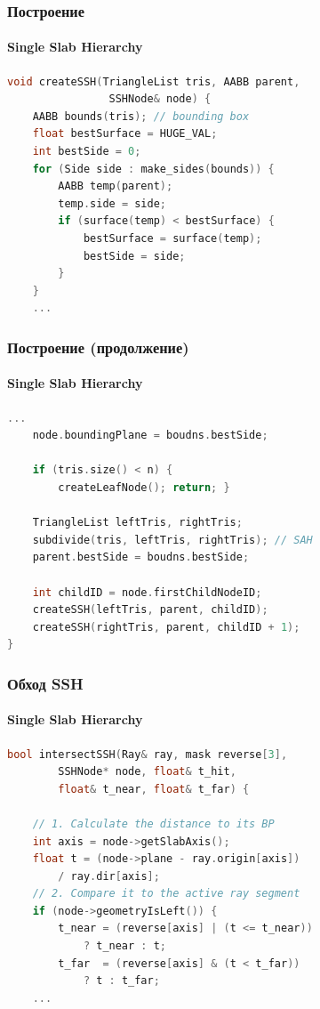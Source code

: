 \documentclass{beamer}
\begin{document}
\begin{frame}[fragile]
    \frametitle{Построение}
    \framesubtitle{Single Slab Hierarchy}

    \begin{lstlisting}[language=C++,basicstyle=\ttfamily,keywordstyle=\color{blue}]
void createSSH(TriangleList tris, AABB parent,
                SSHNode& node) {
    AABB bounds(tris); // bounding box
    float bestSurface = HUGE_VAL;
    int bestSide = 0;
    for (Side side : make_sides(bounds)) {
        AABB temp(parent);
        temp.side = side;
        if (surface(temp) < bestSurface) {
            bestSurface = surface(temp);
            bestSide = side;
        }
    }
    ...

    \end{lstlisting}

\end{frame}

\begin{frame}[fragile]
    \frametitle{Построение (продолжение)}
    \framesubtitle{Single Slab Hierarchy}
    \begin{lstlisting}[language=C++,basicstyle=\ttfamily,keywordstyle=\color{blue}]
    ...
    node.boundingPlane = boudns.bestSide;

    if (tris.size() < n) {
        createLeafNode(); return; }

    TriangleList leftTris, rightTris;
    subdivide(tris, leftTris, rightTris); // SAH
    parent.bestSide = boudns.bestSide;

    int childID = node.firstChildNodeID;
    createSSH(leftTris, parent, childID);
    createSSH(rightTris, parent, childID + 1);
}
    \end{lstlisting}
\end{frame}

\begin{frame}[fragile]
    \frametitle{Обход SSH}
    \framesubtitle{Single Slab Hierarchy}
    \begin{lstlisting}[language=C++,basicstyle=\ttfamily,keywordstyle=\color{blue}]
bool intersectSSH(Ray& ray, mask reverse[3],
        SSHNode* node, float& t_hit,
        float& t_near, float& t_far) {

    // 1. Calculate the distance to its BP
    int axis = node->getSlabAxis();
    float t = (node->plane - ray.origin[axis])
        / ray.dir[axis];
    // 2. Compare it to the active ray segment
    if (node->geometryIsLeft()) {
        t_near = (reverse[axis] | (t <= t_near))
            ? t_near : t;
        t_far  = (reverse[axis] & (t < t_far))
            ? t : t_far;
    ...

    \end{lstlisting}
\end{frame}
\end{document}
